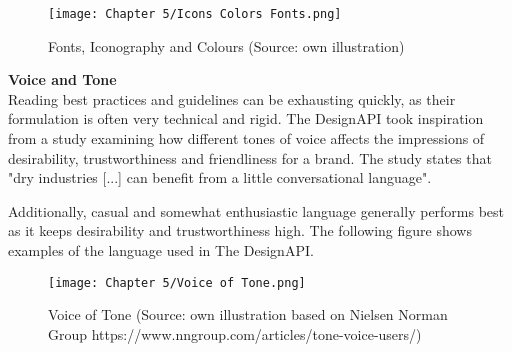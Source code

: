 \begin{figure}[H]
      \centering
      \texttt{[image: Chapter 5/Icons Colors Fonts.png]}
      \caption{Fonts, Iconography and Colours (Source: own illustration)}
\end{figure}


\textbf{Voice and Tone}\\
Reading best practices and guidelines can be exhausting quickly, as their formulation is often very
technical and rigid. The DesignAPI took inspiration from a study examining how different tones of
voice affects the impressions of desirability, trustworthiness and friendliness for a brand.
The study states that "dry industries [...] can benefit from a little conversational language".

Additionally, casual and somewhat enthusiastic language generally performs best as it keeps
desirability and trustworthiness high. 
The following figure shows examples of the language used in The DesignAPI.

\begin{figure}[H]
      \centering
      \texttt{[image: Chapter 5/Voice of Tone.png]}
      \caption{Voice of Tone (Source: own illustration based on Nielsen Norman Group https://www.nngroup.com/articles/tone-voice-users/)}
\end{figure}
